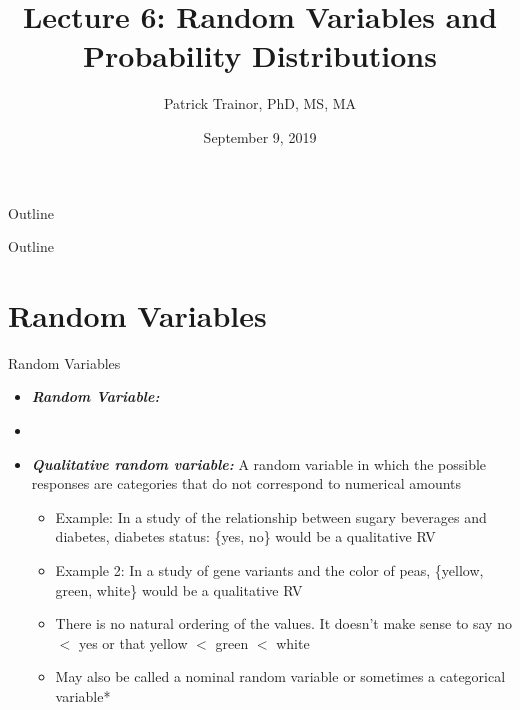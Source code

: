 \documentclass[xcolor=dvipsnames]{beamer}
\title[Lecture 6]{Lecture 6: Random Variables and Probability Distributions}
\author[Patrick Trainor]{Patrick Trainor, PhD, MS, MA}
\institute[NMSU]{New Mexico State University}
\date{September 9, 2019}
\begin{document}
\begin{frame}
	\maketitle
\end{frame}

\begin{frame}{Outline}
	\tableofcontents[hideallsubsections]
\end{frame}

\begin{frame}{Outline}
	\tableofcontents[currentsection,subsectionstyle=show/shaded/hide]
\end{frame}

\section{Random Variables}
\begin{frame}{Random Variables}
	\begin{itemize}
		\item \textbf{\emph{Random Variable:}}
		\item[]
		\item \textbf{\emph{Qualitative random variable:}} A random variable in which the possible responses are categories that do not correspond to numerical amounts
		\begin{itemize}
			\item Example: In a study of the relationship between sugary beverages and diabetes, diabetes status: \{yes, no\} would be a qualitative RV
			\item Example 2: In a study of gene variants and the color of peas, \{yellow, green, white\} would be a qualitative RV
			\item There is no natural ordering of the values. It doesn't make sense to say no $<$ yes or that yellow $<$ green $<$ white
			\item May also be called a nominal random variable or sometimes a categorical variable*
		\end{itemize}
	\end{itemize}
\end{frame}
\end{document}

